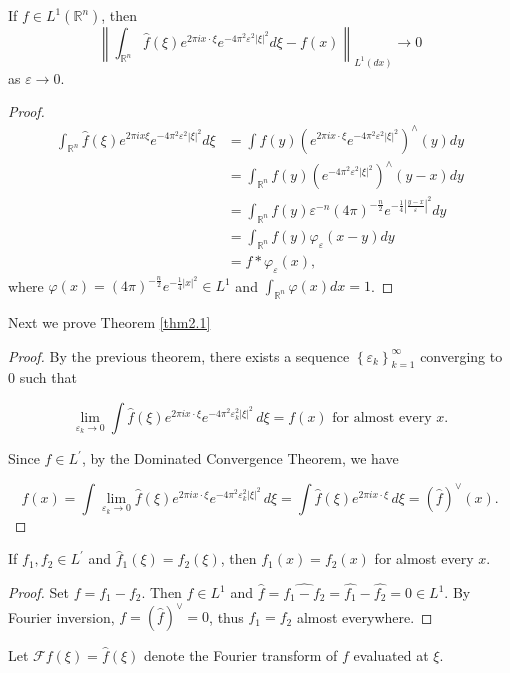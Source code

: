 \begin{theorem}
    If $f \in L^{1}\left(\mathbb{R}^n\right)$, then
$$
\left\| \int_{\mathbb{R}^n} \hat{f}(\xi) e^{2 \pi i x \cdot \xi} e^{-4 \pi^2 \varepsilon^2|\xi|^2} d\xi - f(x) \right\|_{L^{1}(dx)} \rightarrow 0
$$
as $\varepsilon \rightarrow 0$.
\end{theorem}
\begin{proof}
    $$
\begin{aligned}
\int_{\mathbb{R}^n}\hat{f}(\xi) e^{2 \pi i x \xi} e^{-4 \pi^2 \varepsilon^2|\xi|^2} d\xi &= \int f(y) \left(e^{2 \pi i x \cdot \xi} e^{-4 \pi^2 \varepsilon^2|\xi|^2}\right)^{\wedge}(y) dy \\
&= \int_{\mathbb{R}^n} f(y) \left(e^{-4 \pi^2 \varepsilon^2|\xi|^2}\right)^{\wedge}(y-x) dy \\
&= \int_{\mathbb{R}^n} f(y) \varepsilon^{-n}(4 \pi)^{-\frac{n}{2}} e^{-\frac{1}{4}\left|\frac{y-x}{\varepsilon}\right|^2} dy \\
&= \int_{\mathbb{R}^n} f(y) \varphi_{\varepsilon}(x-y) dy \\
&= f * \varphi_{\varepsilon}(x),
\end{aligned}
$$
where $\varphi(x) = (4 \pi)^{-\frac{n}{2}} e^{-\frac{1}{4}|x|^2} \in L^1$ and $\int_{\mathbb{R}^n}\varphi(x) dx= 1$.
\end{proof}
Next we prove Theorem \ref{thm2.1}
\begin{proof}
    By the previous theorem, there exists a sequence $\left\{{\varepsilon_k}\right\}_{k=1}^{\infty}$ converging to 0 such that

$$\lim_{{\varepsilon_k \rightarrow 0}} \int \hat{f}(\xi) e^{2 \pi i x \cdot \xi} e^{-4 \pi^2 \varepsilon_k^2|\xi|^2} \, d\xi = f(x) \text{ for almost every } x.$$

Since $\hat{f} \in L^{\prime}$, by the Dominated Convergence Theorem, we have

$$f(x) = \int \lim_{{\varepsilon_k \rightarrow 0}} \hat{f}(\xi) e^{2 \pi i x \cdot \xi} e^{-4 \pi^2 \varepsilon_k^2|\xi|^2} \, d\xi = \int \hat{f}(\xi) e^{2 \pi i x \cdot \xi} \, d\xi = (\hat{f})^{\vee}(x).$$
\end{proof}
\begin{corollary}
    If $f_1, f_2 \in L^{\prime}$ and $\hat{f}_1(\xi) = \hat{f}_2(\xi)$, then $f_1(x) = f_2(x)$ for almost every $x$.
\end{corollary}
\begin{proof}
    Set $f = f_1 - f_2$. Then $f \in L^1$ and $\hat{f} = \widehat{f_1 - f_2} = \hat{f_1} - \hat{f_2} = 0 \in L^1$.
By Fourier inversion, $f = (\hat{f})^{\vee} = 0$, thus $f_1 = f_2$ almost everywhere.
\end{proof}
\begin{rmk}
    Let $\mathcal{F}f(\xi) = \hat{f}(\xi)$ denote the Fourier transform of $f$ evaluated at $\xi$.
\end{rmk} 
